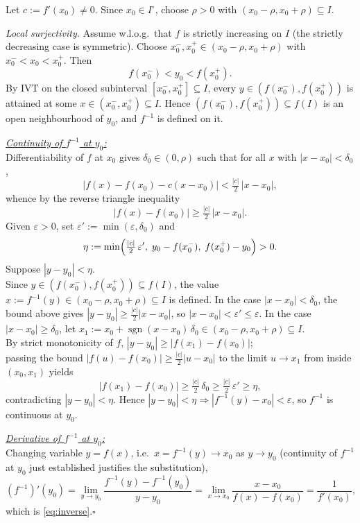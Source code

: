 \documentclass[11pt,reqno]{amsart}
\makeatletter
\theoremstyle{redplain}
\renewenvironment{proof}[1][Proof]{\noindent\textbf{#1.}\ }{\ }
\renewenvironment{proof}[1][\proofname]{%
	\proof@ORIG[#1]\mbox{}\par\nobreak
}{%
	\endproof@ORIG
}
\makeatother
\begin{document}
\begin{proof}[Proof of \autoref{thm:inverse}]
	Let $c:=f'(x_0)\ne 0$. Since $x_0\in I^\circ$, choose $\rho>0$ with $(x_0-\rho,x_0+\rho)\subseteq I$.
	
	\emph{Local surjectivity.} Assume w.l.o.g.\ that $f$ is strictly increasing on $I$ (the strictly decreasing case is symmetric). Choose $x_0^{-},x_0^{+}\in(x_0-\rho,x_0+\rho)$ with $x_0^{-}<x_0<x_0^{+}$. Then
	\[
	f(x_0^{-})<y_0<f(x_0^{+}).
	\]
	By IVT on the closed subinterval $[x_0^{-},x_0^{+}]\subseteq I$, every $y\in(f(x_0^{-}),f(x_0^{+}))$ is attained at some $x\in(x_0^{-},x_0^{+})\subseteq I$. Hence $(f(x_0^{-}),f(x_0^{+}))\subseteq f(I)$ is an open neighbourhood of $y_0$, and $f^{-1}$ is defined on it.
	
	\underline{\emph{Continuity of $f^{-1}$ at $y_0$:}}\\ Differentiability of $f$ at $x_0$ gives $\delta_0\in(0,\rho)$ such that for all $x$ with $|x-x_0|<\delta_0$,
	\[
	|f(x)-f(x_0)-c(x-x_0)|<\tfrac{|c|}{2}\,|x-x_0|,
	\]
	whence by the reverse triangle inequality
	\[
	|f(x)-f(x_0)|\ge\tfrac{|c|}{2}\,|x-x_0|.
	\]
	Given $\varepsilon>0$, set $\varepsilon':=\min(\varepsilon,\delta_0)$ and
	\[
	\eta:=\min\Bigl(\tfrac{|c|}{2}\,\varepsilon',\; y_0-f(x_0^{-}),\; f(x_0^{+})-y_0\Bigr)>0.
	\]
	Suppose $|y-y_0|<\eta$.\\ Since $y\in(f(x_0^{-}),f(x_0^{+}))\subseteq f(I)$, the value $x:=f^{-1}(y)\in(x_0-\rho,x_0+\rho)\subseteq I$ is defined. In the case $|x-x_0|<\delta_0$, the bound above gives $|y-y_0|\ge\tfrac{|c|}{2}|x-x_0|$, so $|x-x_0|<\varepsilon'\le\varepsilon$. In the case $|x-x_0|\ge\delta_0$, let $x_1:=x_0+\operatorname{sgn}(x-x_0)\,\delta_0\in(x_0-\rho,x_0+\rho)\subseteq I$.\\ By strict monotonicity of $f$, $|y-y_0|\ge|f(x_1)-f(x_0)|$;\\ passing the bound $|f(u)-f(x_0)|\ge\tfrac{|c|}{2}|u-x_0|$ to the limit $u\to x_1$ from inside $(x_0,x_1)$ yields
	\[
	|f(x_1)-f(x_0)|\ge\tfrac{|c|}{2}\,\delta_0
	\ge\tfrac{|c|}{2}\,\varepsilon'
	\ge\eta,
	\]
	contradicting $|y-y_0|<\eta$. Hence $|y-y_0|<\eta\Rightarrow|f^{-1}(y)-x_0|<\varepsilon$, so $f^{-1}$ is continuous at $y_0$.
	
	\underline{\emph{Derivative of $f^{-1}$ at $y_0$:}}\\ Changing variable $y=f(x)$, i.e.\ $x=f^{-1}(y)\to x_0$ as $y\to y_0$ (continuity of $f^{-1}$ at $y_0$ just established justifies the substitution),
	\[
	(f^{-1})'(y_0)
	=\lim_{y\to y_0}\frac{f^{-1}(y)-f^{-1}(y_0)}{y-y_0}
	=\lim_{x\to x_0}\frac{x-x_0}{f(x)-f(x_0)}
	=\frac{1}{f'(x_0)},
	\]
	which is \autoref{eq:inverse}.\hfill$\square$
\end{proof}
\end{document}
